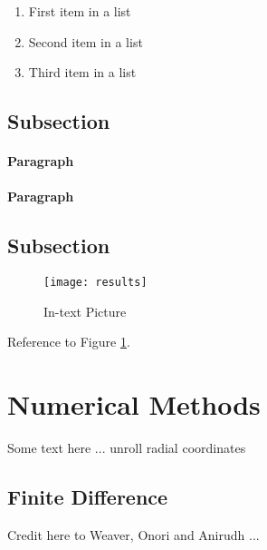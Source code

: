 \documentclass[fleqn,10pt]{SelfArx} %
\begin{document}
\lipsum[2] %

\begin{enumerate}[noitemsep] %
	\item First item in a list
	\item Second item in a list
	\item Third item in a list
\end{enumerate}

\subsection{Subsection}

\lipsum[3] %

\paragraph{Paragraph} \lipsum[7] %
\paragraph{Paragraph} \lipsum[8] %

\subsection{Subsection}

\lipsum[4] %

\begin{figure}[ht]\centering
	\texttt{[image: results]}
	\caption{In-text Picture}
	\label{fig:results}
\end{figure}

Reference to Figure \ref{fig:results}.


\section{Numerical Methods}

Some text here ... unroll radial coordinates 

\subsection{Finite Difference}

Credit here to Weaver, Onori and Anirudh ...
\end{document}
